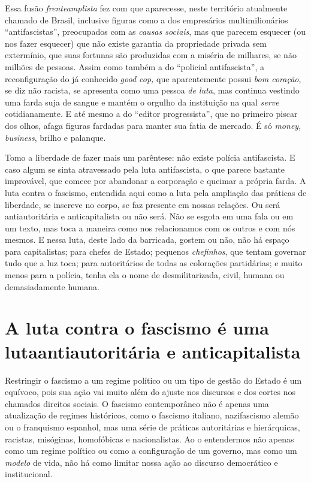 Essa fusão \emph{frenteamplista} fez com que aparecesse, neste
território atualmente chamado de Brasil, inclusive figuras como a dos
empresários multimilionários ``antifascistas'', preocupados com as
\emph{causas sociais}, mas que parecem esquecer (ou nos fazer esquecer)
que não existe garantia da propriedade privada sem extermínio, que suas
fortunas são produzidas com a miséria de milhares, se não milhões de
pessoas. Assim como também a do ``policial antifascista'',
a reconfiguração do já conhecido \emph{good cop,} que aparentemente
possui \emph{bom coração}, se diz não racista, se apresenta como uma
pessoa \emph{de luta}, mas continua vestindo uma farda suja de sangue e
mantém o orgulho da instituição na qual \emph{serve} cotidianamente. E
até mesmo a do ``editor progressista'', que no primeiro piscar
dos olhos, afaga figuras fardadas para manter sua fatia de mercado. É só
\emph{money, business}, brilho e palanque.

Tomo a liberdade de fazer mais um parêntese: não existe polícia
antifascista. E caso algum se sinta atravessado pela luta antifascista,
o que parece bastante improvável, que comece por abandonar a corporação
e queimar a própria farda. A luta contra o fascismo, entendida aqui como
a luta pela ampliação das práticas de liberdade, se inscreve no corpo,
se faz presente em nossas relações. Ou será antiautoritária e
anticapitalista ou não será. Não se esgota em uma fala ou em um texto,
mas toca a maneira como nos relacionamos com os outros e com nós mesmos.
E nessa luta, deste lado da barricada, gostem ou não, não há espaço para
capitalistas; para chefes de Estado; pequenos \emph{chefinhos}, que
tentam governar tudo que a luz toca; para autoritários de todas as
colorações partidárias; e muito menos para a polícia, tenha ela o nome
de desmilitarizada, civil, humana ou demasiadamente humana.

\section{A luta contra o fascismo é uma luta\break antiautoritária e anticapitalista}

Restringir o fascismo a um regime político ou um tipo de gestão do
Estado é um equívoco, pois sua ação vai muito além do ajuste nos
discursos e dos cortes nos chamados direitos sociais. O fascismo
contemporâneo não é apenas uma atualização de regimes históricos, como o
fascismo italiano, nazifascismo alemão ou o franquismo espanhol, mas uma
série de práticas autoritárias e hierárquicas, racistas, misóginas,
homofóbicas e nacionalistas. Ao o entendermos não apenas como um regime
político ou como a configuração de um governo, mas como um \emph{modelo}
de vida, não há como limitar nossa ação ao discurso democrático e
institucional.

